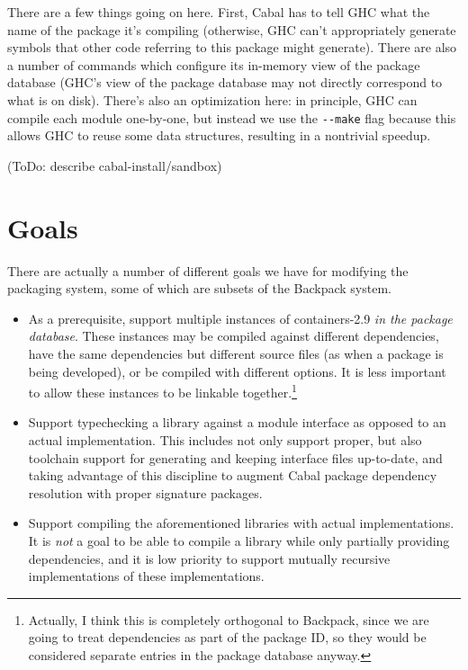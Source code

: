 \documentclass{article}
\begin{document}
There are a few things going on here.  First, Cabal has to tell GHC
what the name of the package it's compiling (otherwise, GHC can't appropriately
generate symbols that other code referring to this package might generate).
There are also a number of commands which configure its in-memory view of
the package database (GHC's view of the package database may not directly
correspond to what is on disk).  There's also an optimization here: in principle,
GHC can compile each module one-by-one, but instead we use the \verb|--make| flag
because this allows GHC to reuse some data structures, resulting in a nontrivial
speedup.

(ToDo: describe cabal-install/sandbox)

\section{Goals}

There are actually a number of different goals we have for modifying the
packaging system, some of which are subsets of the Backpack system.

\begin{itemize}
    \item As a prerequisite, support multiple instances of containers-2.9 \emph{in the
        package database}.  These instances may be compiled against
        different dependencies, have the same dependencies but different
        source files (as when a package is being developed), or be
        compiled with different options.  It is less important to allow
        these instances to be linkable together.\footnote{Actually, I think
        this is completely orthogonal to Backpack, since we are going to treat
        dependencies as part of the package ID, so they would be considered
        separate entries in the package database anyway.}

    \item Support typechecking a library against a module interface
        as opposed to an actual implementation.  This includes not
        only support proper, but also toolchain support for generating
        and keeping interface files up-to-date, and taking advantage
        of this discipline to augment Cabal package dependency resolution
        with proper signature packages. %

    \item Support compiling the aforementioned libraries with actual implementations.
        It is \emph{not} a goal to be able to compile a library while only
        partially providing dependencies, and it is low priority to support
        mutually recursive implementations of these implementations.
\end{itemize}
\end{document}
